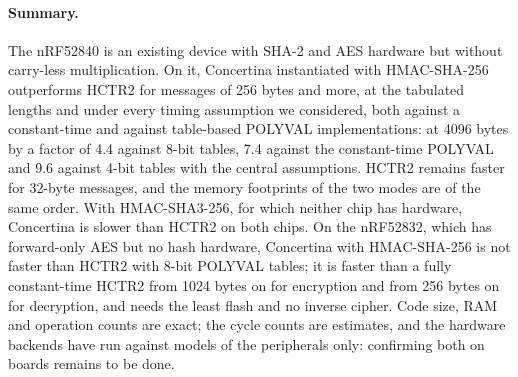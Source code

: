\paragraph{Summary.}
The nRF52840 is an existing device with SHA-2 and AES hardware but without
carry-less multiplication. On it, Concertina instantiated with HMAC-SHA-256
outperforms HCTR2 for messages of 256 bytes and more, at the tabulated
lengths and under every timing assumption we considered, both against a
constant-time and against table-based POLYVAL implementations: at 4096
bytes by a factor of 4.4 against 8-bit tables,
7.4 against the constant-time POLYVAL and
9.6 against 4-bit tables with the central assumptions.
HCTR2 remains faster for 32-byte messages, and the memory footprints of the
two modes are of the same order. With HMAC-SHA3-256, for which neither chip
has hardware, Concertina is slower than HCTR2 on both chips. On the
nRF52832, which has forward-only AES but no hash hardware, Concertina with
HMAC-SHA-256 is not faster than HCTR2 with 8-bit POLYVAL tables; it is
faster than a fully constant-time HCTR2 from 1024 bytes on for
encryption and from 256 bytes on for decryption, and needs the
least flash and no inverse cipher. Code size, RAM and operation counts are
exact; the cycle counts are estimates, and the hardware backends have run
against models of the peripherals only: confirming both on boards remains
to be done.
